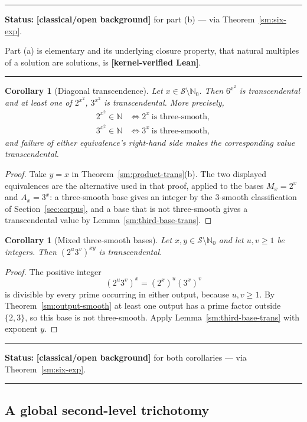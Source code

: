\documentclass[11pt,oneside]{article}
\newtheorem{corollary}[theorem]{Corollary}
\theoremstyle{definition}
\theoremstyle{remark}
\newcommand{\N}{\mathbb N}
\newcommand{\Nzero}{\mathbb N_0}
\newcommand{\Sol}{\mathcal S}
\newcommand{\statuslean}{\textcolor{leanblue}{\textbf{[kernel-verified Lean]}}}
\newcommand{\statusknown}{\textcolor{classicalgray}{\textbf{[classical/open background]}}}
\newenvironment{statusbox}[1]
{\begin{center}\begin{minipage}{0.94\textwidth}\raggedright\hbadness=10000\hrule
\vspace{0.45em}\textbf{Status:} #1\par\vspace{0.35em}}
{\vspace{0.35em}\hrule\end{minipage}\end{center}}
\begin{document}
\begin{statusbox}{\statusknown{} for part (b) --- via Theorem~\ref{sm:six-exp}.}
Part (a) is elementary and its underlying closure property, that natural multiples of a
solution are solutions, is \statuslean{}.
\end{statusbox}

\begin{corollary}[Diagonal transcendence]
\label{sm:diagonal-trans}
Let $x\in\Sol\setminus\Nzero$.  Then $6^{x^2}$ is transcendental and at least one of
$2^{x^2}$, $3^{x^2}$ is transcendental.  More precisely,
\[
\begin{aligned}
 2^{x^2}\in\N &\iff 2^x\ \text{is three-smooth},\\
 3^{x^2}\in\N &\iff 3^x\ \text{is three-smooth},
\end{aligned}
\]
and failure of either equivalence's right-hand side makes the corresponding value
transcendental.
\end{corollary}

\begin{proof}
Take $y=x$ in Theorem~\ref{sm:product-trans}(b).  The two displayed equivalences are the
alternative used in that proof, applied to the bases $M_x=2^x$ and $A_x=3^x$: a three-smooth
base gives an integer by the $3$-smooth classification of Section~\ref{sec:corpus}, and a
base that is not three-smooth gives a transcendental value by
Lemma~\ref{sm:third-base-trans}.
\end{proof}

\begin{corollary}[Mixed three-smooth bases]
\label{sm:mixed-base-trans}
Let $x,y\in\Sol\setminus\Nzero$ and let $u,v\ge1$ be integers.  Then $(2^u3^v)^{xy}$ is
transcendental.
\end{corollary}

\begin{proof}
The positive integer
\[
 (2^u3^v)^x=(2^x)^u(3^x)^v
\]
is divisible by every prime occurring in either output, because $u,v\ge1$.  By
Theorem~\ref{sm:output-smooth} at least one output has a prime factor outside $\{2,3\}$, so
this base is not three-smooth.  Apply Lemma~\ref{sm:third-base-trans} with exponent $y$.
\end{proof}

\begin{statusbox}{\statusknown{} for both corollaries --- via Theorem~\ref{sm:six-exp}.}
\end{statusbox}

\subsection{A global second-level trichotomy}
\end{document}
